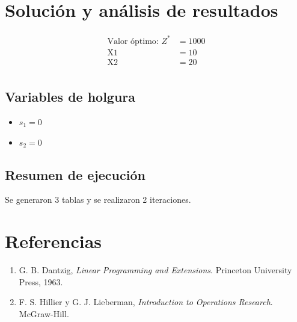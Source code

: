 \documentclass[11pt,oneside]{report}
\begin{document}
\chapter{Solución y análisis de resultados}
\begin{center}\end{center}
\begin{align*}\text{Valor óptimo: } Z^* &= 1000\\
\text{X1} &= 10\\
\text{X2} &= 20\\
\end{align*}
\section{Variables de holgura}
\begin{itemize}
\item $s_{1}=0$
\item $s_{2}=0$
\end{itemize}
\section{Resumen de ejecución}
Se generaron 3 tablas y se realizaron 2 iteraciones.
\chapter{Referencias}
\renewcommand{\labelenumi}{[\theenumi]}
\begin{enumerate}
\item G. B. Dantzig, \textit{Linear Programming and Extensions}. Princeton University Press, 1963.
\item F. S. Hillier y G. J. Lieberman, \textit{Introduction to Operations Research}. McGraw-Hill.
\end{enumerate}
\end{document}
